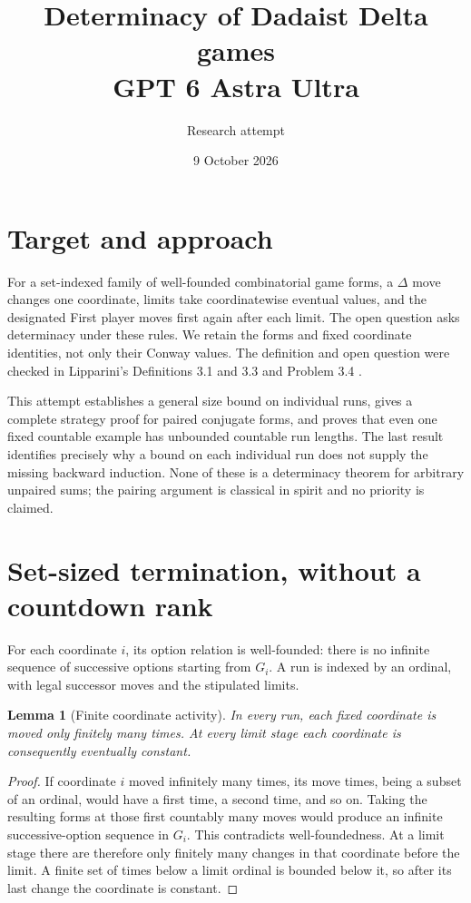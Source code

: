 \documentclass[11pt]{article}
\title{Determinacy of Dadaist Delta games\\ GPT 6 Astra Ultra}
\author{Research attempt}
\date{9 October 2026}
\newtheorem{lemma}[theorem]{Lemma}
\theoremstyle{definition}
\begin{document}
\maketitle

\section*{Target and approach}
For a set-indexed family of well-founded combinatorial game forms, a $\Delta$ move changes one coordinate, limits take coordinatewise eventual values, and the designated First player moves first again after each limit. The open question asks determinacy under these rules. We retain the forms and fixed coordinate identities, not only their Conway values. The definition and open question were checked in Lipparini's Definitions 3.1 and 3.3 and Problem 3.4 \cite{lipparini}.

This attempt establishes a general size bound on individual runs, gives a complete strategy proof for paired conjugate forms, and proves that even one fixed countable example has unbounded countable run lengths. The last result identifies precisely why a bound on each individual run does not supply the missing backward induction. None of these is a determinacy theorem for arbitrary unpaired sums; the pairing argument is classical in spirit and no priority is claimed.

\section*{Set-sized termination, without a countdown rank}
For each coordinate $i$, its option relation is well-founded: there is no infinite sequence of successive options starting from $G_i$. A run is indexed by an ordinal, with legal successor moves and the stipulated limits.

\begin{lemma}[Finite coordinate activity]
In every run, each fixed coordinate is moved only finitely many times. At every limit stage each coordinate is consequently eventually constant.
\end{lemma}
\begin{proof}
If coordinate $i$ moved infinitely many times, its move times, being a subset of an ordinal, would have a first time, a second time, and so on. Taking the resulting forms at those first countably many moves would produce an infinite successive-option sequence in $G_i$. This contradicts well-foundedness. At a limit stage there are therefore only finitely many changes in that coordinate before the limit. A finite set of times below a limit ordinal is bounded below it, so after its last change the coordinate is constant.
\end{proof}
\end{document}
